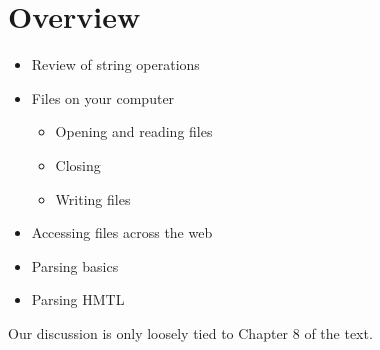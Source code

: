 \documentclass[letterpaper,10pt,english]{sphinxmanual}
\begin{document}
\section{Overview}
\label{\detokenize{lecture_notes/lec13_files_web:overview}}\begin{itemize}
\item {} 
Review of string operations

\item {} 
Files on your computer
\begin{itemize}
\item {} 
Opening and reading files

\item {} 
Closing

\item {} 
Writing files

\end{itemize}

\item {} 
Accessing files across the web

\item {} 
Parsing basics

\item {} 
Parsing HMTL

\end{itemize}

Our discussion is only loosely tied to Chapter 8 of the text.
\end{document}
